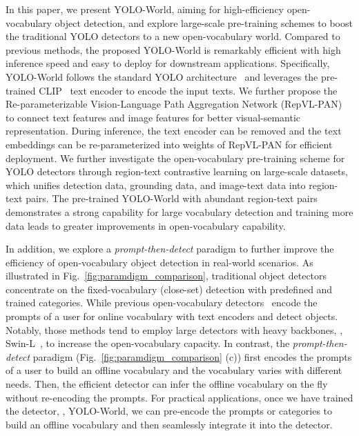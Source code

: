 \documentclass[10pt,twocolumn,letterpaper]{article}
\newcommand{\name}{YOLO-World}
\begin{document}
In this paper, we present \name{}, aiming for high-efficiency open-vocabulary object detection, and explore large-scale pre-training schemes to boost the traditional YOLO detectors to a new open-vocabulary world.
Compared to previous methods, the proposed \name{} is remarkably efficient with high inference speed and easy to deploy for downstream applications.
Specifically, \name{} follows the standard YOLO architecture~\cite{yolov8_ultralytics} and leverages the pre-trained CLIP~\cite{CLIP} text encoder to encode the input texts.
We further propose the Re-parameterizable Vision-Language Path Aggregation Network (RepVL-PAN) to connect text features and image features for better visual-semantic representation.
During inference, the text encoder can be removed and the text embeddings can be re-parameterized into weights of RepVL-PAN for efficient deployment.
We further investigate the open-vocabulary pre-training scheme for YOLO detectors through region-text contrastive learning on large-scale datasets, which unifies detection data, grounding data, and image-text data into region-text pairs.
The pre-trained \name{} with abundant region-text pairs demonstrates a strong capability for large vocabulary detection and training more data leads to greater improvements in open-vocabulary capability.

In addition, we explore a \textit{prompt-then-detect} paradigm to further improve the efficiency of open-vocabulary object detection in real-world scenarios.
As illustrated in Fig.~\ref{fig:paramdigm_comparison}, traditional object detectors~\cite{MaskR-CNN,YOLO,YOLOv1,Yolov3,YOLOv6,YOLOv7,yolov8_ultralytics} concentrate on the fixed-vocabulary (close-set) detection with predefined and trained categories.
While previous open-vocabulary detectors~\cite{GLIP,GLIPv2,GroundingDINO,DetCLIP} encode the prompts of a user for online vocabulary with text encoders and detect objects.
Notably, those methods tend to employ large detectors with heavy backbones, \eg, Swin-L~\cite{SwinTransformer}, to increase the open-vocabulary capacity.
In contrast, the \textit{prompt-then-detect} paradigm (Fig.~\ref{fig:paramdigm_comparison} (c)) first encodes the prompts of a user to build an offline vocabulary and the vocabulary varies with different needs.
Then, the efficient detector can infer the offline vocabulary on the fly without re-encoding the prompts.
For practical applications, once we have trained the detector, \ie, \name{}, we can pre-encode the prompts or categories to build an offline vocabulary and then seamlessly integrate it into the detector.
\end{document}
